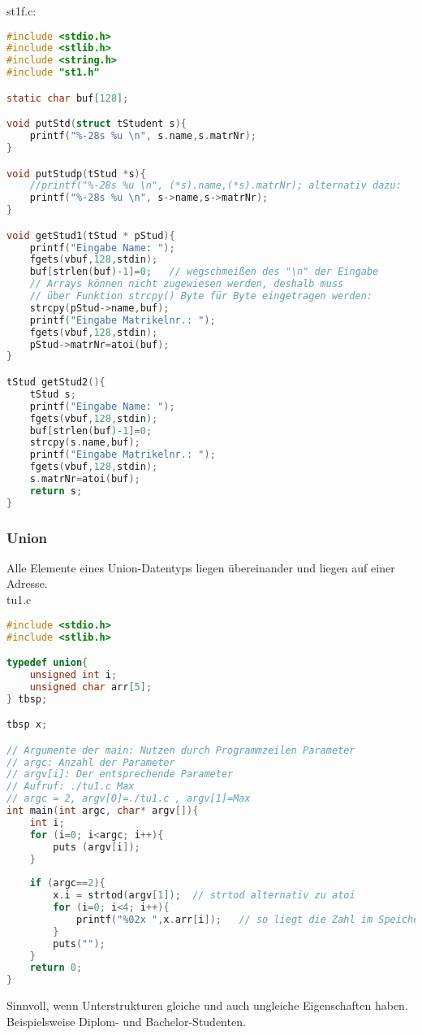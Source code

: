st1f.c:
\begin{lstlisting}[language=C]
#include <stdio.h>
#include <stlib.h>
#include <string.h>
#include "st1.h"

static char buf[128]; 

void putStd(struct tStudent s){
	printf("%-28s %u \n", s.name,s.matrNr);
}

void putStudp(tStud *s){
	//printf("%-28s %u \n", (*s).name,(*s).matrNr); alternativ dazu:
	printf("%-28s %u \n", s->name,s->matrNr);
}

void getStud1(tStud * pStud){
	printf("Eingabe Name: ");
	fgets(vbuf,128,stdin); 
	buf[strlen(buf)-1]=0;	// wegschmeißen des "\n" der Eingabe
	// Arrays können nicht zugewiesen werden, deshalb muss 
	// über Funktion strcpy() Byte für Byte eingetragen werden:
	strcpy(pStud->name,buf);
	printf("Eingabe Matrikelnr.: "); 
	fgets(vbuf,128,stdin); 
	pStud->matrNr=atoi(buf);
}

tStud getStud2(){
	tStud s;
	printf("Eingabe Name: ");
	fgets(vbuf,128,stdin); 
	buf[strlen(buf)-1]=0;
	strcpy(s.name,buf);
	printf("Eingabe Matrikelnr.: "); 
	fgets(vbuf,128,stdin); 
	s.matrNr=atoi(buf);
	return s;
}
\end{lstlisting}
\subsubsection{Union}
Alle Elemente eines Union-Datentyps liegen übereinander und liegen auf einer Adresse. \medskip\\
tu1.c
\begin{lstlisting}[language=C]
#include <stdio.h>
#include <stlib.h>

typedef union{
	unsigned int i;
	unsigned char arr[5];
} tbsp;

tbsp x;

// Argumente der main: Nutzen durch Programmzeilen Parameter
// argc: Anzahl der Parameter
// argv[i]: Der entsprechende Parameter
// Aufruf: ./tu1.c Max
// argc = 2, argv[0]=./tu1.c , argv[1]=Max
int main(int argc, char* argv[]){
	int i;
	for (i=0; i<argc; i++){
		puts (argv[i]);
	}
	
	if (argc==2){
		x.i = strtod(argv[1]);	// strtod alternativ zu atoi
		for (i=0; i<4; i++){
			printf("%02x ",x.arr[i]);	// so liegt die Zahl im Speicher
		}
		puts("");
	}
	return 0;
}

\end{lstlisting}

Sinnvoll, wenn Unterstrukturen gleiche und auch ungleiche Eigenschaften haben. Beispielsweise Diplom- und Bachelor-Studenten.

